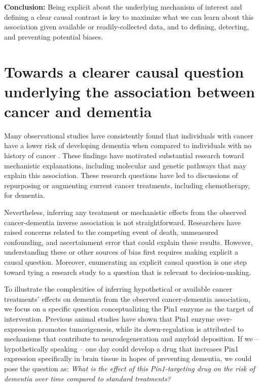 \documentclass[
]{book}
\begin{document}
\textbf{Conclusion:} Being explicit about the underlying mechanism of interest and defining a clear causal contrast is key to maximize what we can learn about this association given available or readily-collected data, and to defining, detecting, and preventing potential biases.

\newpage

\hypertarget{towards-a-clearer-causal-question-underlying-the-association-between-cancer-and-dementia}{%
\section{Towards a clearer causal question underlying the association between cancer and dementia}\label{towards-a-clearer-causal-question-underlying-the-association-between-cancer-and-dementia}}

Many observational studies have consistently found that individuals with cancer have a lower risk of developing dementia when compared to individuals with no history of cancer \autocite{ma2014,hanson2016,vanderwillik2018,ospina2020}. These findings have motivated substantial research toward mechanistic explanations, including molecular and genetic pathways that may explain this association\autocite{behrens2009,harris2014,nudelman2019,Papin2020,driverbiogeront2014,olson2019,li2021,driverpin2015}. These research questions have led to discussions of repurposing or augmenting current cancer treatments, including chemotherapy, for dementia\autocite{snyder2017}.

Nevertheless, inferring any treatment or mechanistic effects from the observed cancer-dementia inverse association is not straightforward. Researchers have raised concerns related to the competing event of death, unmeasured confounding, and ascertainment error that could explain these results\autocite{driverbiogeront2014,ganguli2015}. However, understanding these or other sources of bias first requires making explicit a causal question. Moreover, enumerating an explicit causal question is one step toward tying a research study to a question that is relevant to decision-making\autocite{didelez2016,labrecque2017}.

To illustrate the complexities of inferring hypothetical or available cancer treatments' effects on dementia from the observed cancer-dementia association, we focus on a specific question conceptualizing the Pin1 enzyme as the target of intervention. Previous animal studies have shown that Pin1 enzyme over-expression promotes tumorigenesis, while its down-regulation is attributed to mechanisms that contribute to neurodegeneration and amyloid deposition\autocite{driverpin2015,angelucci2017,li2021}. If we -- hypothetically speaking -- one day could develop a drug that increases Pin1 expression specifically in brain tissue in hopes of preventing dementia, we could pose the question as: \emph{What is the effect of this Pin1-targeting drug on the risk of dementia over time compared to standard treatments?}
\end{document}
